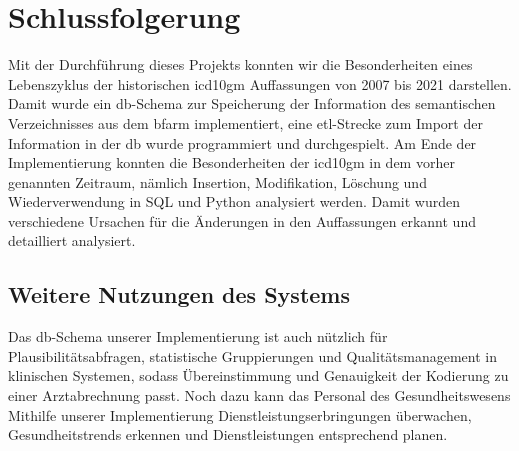 \chapter{Schlussfolgerung} \label{ch:conclusion}

Mit der Durchführung dieses Projekts konnten wir die Besonderheiten eines Lebenszyklus der historischen \ac{icd10gm} Auffassungen von 2007 bis 2021 darstellen. Damit wurde ein \ac{db}-Schema zur Speicherung der Information des semantischen Verzeichnisses aus dem \ac{bfarm} implementiert, eine \ac{etl}-Strecke zum Import der Information in der \ac{db} wurde programmiert und durchgespielt. Am Ende der Implementierung konnten die Besonderheiten der \ac{icd10gm} in dem vorher genannten Zeitraum, nämlich Insertion, Modifikation, Löschung und Wiederverwendung in SQL und Python analysiert werden. Damit wurden verschiedene Ursachen für die Änderungen in den Auffassungen erkannt und detailliert analysiert.

\section{Weitere Nutzungen des Systems} \label{sec:future}

Das \ac{db}-Schema unserer Implementierung ist auch nützlich für Plausibilitätsabfragen, statistische Gruppierungen und Qualitätsmanagement in klinischen Systemen, sodass Übereinstimmung und Genauigkeit der Kodierung zu einer Arztabrechnung passt. Noch dazu kann das Personal des Gesundheitswesens Mithilfe unserer Implementierung Dienstleistungserbringungen überwachen, Gesundheitstrends erkennen und Dienstleistungen entsprechend planen.